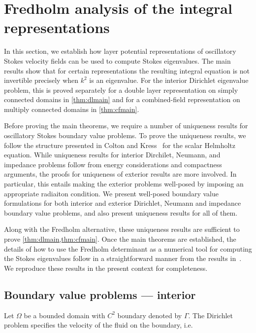 \section{Fredholm analysis of the integral representations}
\label{sec:analysis}
In this section, we establish how layer potential
representations of oscillatory Stokes velocity fields
can be used to compute Stokes eigenvalues.
%
The main results show that for certain representations
the resulting integral equation is not invertible precisely
when $k^2$ is an eigenvalue.
%
For the interior Dirichlet eigenvalue problem, this is
proved separately for a double layer representation on
simply connected domains in \cref{thm:dlmain} and
for a combined-field representation on multiply connected
domains in \cref{thm:cfmain}.
%

Before proving the main theorems, we require a number
of uniqueness results for oscillatory Stokes boundary
value problems.
%
To prove the uniqueness results, we follow the 
structure presented in Colton and Kress~\cite[Ch. 3]{colton1983integral}
for the scalar Helmholtz equation.
While uniqueness results for interior Dirchilet, Neumann, and impedance
problems follow from energy considerations and compactness
arguments, the proofs for uniqueness of exterior
results are more involved. 
In particular,
this entails making the exterior problems
well-posed by imposing an appropriate radiaiton condition.
We present well-posed boundary value formulations 
for both interior and exterior Dirichlet, Neumann and impedance
boundary value problems, and also
present uniqueness results for all of them.

Along with the Fredholm alternative, these uniqueness
results are sufficient to prove
\cref{thm:dlmain,thm:cfmain}.
%
Once the main theorems are established,
the details of how to use the Fredholm determinant
as a numerical tool for computing the Stokes eigenvalues
follow in a straightforward manner from the results
in~\cite{zhao2015robust}.
%
We reproduce these results in the present
context for completeness.

\subsection{Boundary value problems --- interior}

Let $\Omega$ be a bounded domain with $C^2$ boundary
denoted by $\Gamma$.
The Dirichlet problem specifies the
velocity of the fluid on the boundary, i.e.

